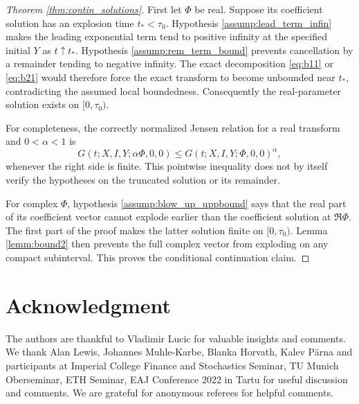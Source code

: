 \documentclass[11pt,a4paper] {article}
\begin{document}
\begin{proof}[Theorem \ref{thm:contin_solutions}]
First let $\Phi$ be real. Suppose its coefficient solution has an explosion
time $t_*<\tau_0$. Hypothesis \ref{assump:lead_term_infin} makes the leading
exponential term tend to positive infinity at the specified initial $Y$ as
$t\uparrow t_*$. Hypothesis \ref{assump:rem_term_bound} prevents cancellation
by a remainder tending to negative infinity. The exact decomposition
\eqref{eq:b11} or \eqref{eq:b21} would therefore force the exact transform to
become unbounded near $t_*$, contradicting the assumed local boundedness.
Consequently the real-parameter solution exists on $[0,\tau_0)$.

For completeness, the correctly normalized Jensen relation for a real transform
and $0<\alpha<1$ is
\begin{equation}\label{eq:contin_contrad2}
G(t;X,I,Y;\alpha\Phi,0,0)
\leq G(t;X,I,Y;\Phi,0,0)^\alpha,
\end{equation}
whenever the right side is finite. This pointwise inequality does not by itself
verify the hypotheses on the truncated solution or its remainder.

For complex $\Phi$, hypothesis \ref{assump:blow_up_uppbound} says that the real
part of its coefficient vector cannot explode earlier than the coefficient
solution at $\Re\Phi$. The first part of the proof makes the latter solution
finite on $[0,\tau_0)$. Lemma \ref{lemm:bound2} then prevents the full complex
vector from exploding on any compact subinterval. This proves the conditional
continuation claim.
\end{proof}



\section*{Acknowledgment}

The authors are thankful to Vladimir Lucic for valuable insights and comments. We thank Alan Lewis, Johannes Muhle-Karbe, Blanka Horvath, Kalev P\"arna and participants at Imperial College Finance and Stochastics Seminar, TU Munich Oberseminar, ETH Seminar, EAJ Conference 2022 in Tartu for useful discussion and comments. We are grateful for anonymous referees for helpful comments. 
\end{document}
